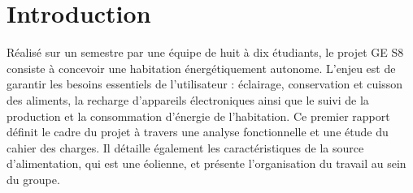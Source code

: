 \chapter*{Introduction}

\hspace{1cm} Réalisé sur un semestre par une équipe de huit à dix étudiants, le projet GE S8 consiste à concevoir une habitation énergétiquement autonome. L'enjeu est de garantir les besoins essentiels de l'utilisateur : éclairage, conservation et cuisson des aliments, la recharge d'appareils électroniques ainsi que le suivi de la production et la consommation d'énergie de l'habitation. Ce premier rapport définit le cadre du projet à travers une analyse fonctionnelle et une étude du cahier des charges. Il détaille également les caractéristiques de la source d'alimentation, qui est une éolienne, et présente l'organisation du travail au sein du groupe.